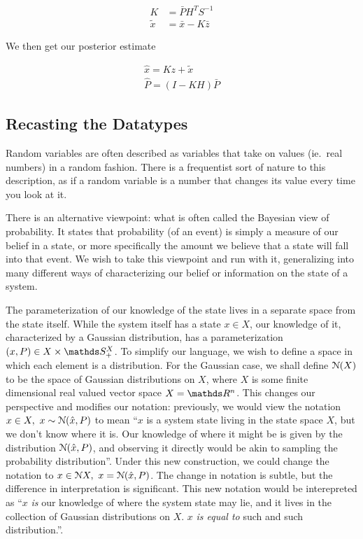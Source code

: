\begin{align}
	K &= \bar{P}H^T S^{-1}\\
	\tilde{x} &= \bar{x} - K\bar{z}
\end{align}

We then get our posterior estimate

\begin{align}
	\hat{x} = Kz + \tilde{x} \\
	\hat{P} = (I-KH)\bar{P}
\end{align}


\subsection{Recasting the Datatypes}

Random variables are often described as variables that take on values (ie.\ real numbers) in a random fashion.
There is a frequentist sort of nature to this description, as if a random variable is a number that changes its value every time you look at it.


There is an alternative viewpoint: what is often called the Bayesian view of probability.
It states that probability (of an event) is simply a measure of our belief in a state, or more specifically the amount we believe that a state will fall into that event.
We wish to take this viewpoint and run with it, generalizing into many different ways of characterizing our belief or information on the state of a system.

The parameterization of our knowledge of the state lives in a separate space from the state itself.
While the system itself has a state $x\in X$, our knowledge of it, characterized by a Gaussian distribution, has a parameterization $(x,P)\in X\times \symmetric^X_+$.
To simplify our language, we wish to define a space in which each element is a distribution. For the Gaussian case, we shall define $\mathcal{N}(X)$ to be the space of Gaussian distributions on $X$, where $X$ is some finite dimensional real valued vector space $X=\reals^n$. This changes our perspective and modifies our notation: previously, we would view the notation $x\in X,\ x\sim \mathcal{N}(\hat{x}, P)$ to mean ``$x$ is a system state living in the state space $X$, but we don't know where it is. Our knowledge of where it might be is given by the distribution $\mathcal{N}(\hat{x}, P)$, and observing it directly would be akin to sampling the probability distribution''. Under this new construction, we could change the notation to $x\in \mathcal{N} X,\ x = \mathcal{N}(\hat{x}, P)$.
The change in notation is subtle, but the difference in interpretation is significant. This new notation would be interepreted as ``$x$ \emph{is} our knowledge of where the system state may lie, and it lives in the collection of Gaussian distributions on $X$. $x$ \emph{is equal to} such and such distribution.''.

